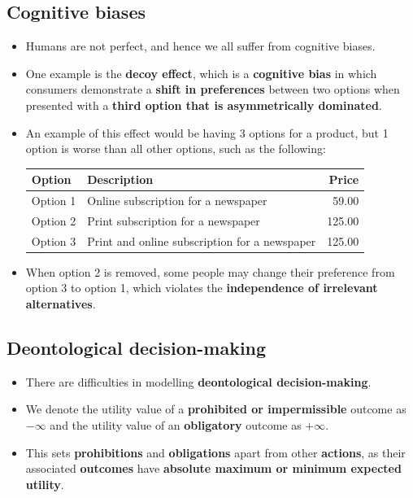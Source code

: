 \documentclass[11pt]{article}
\begin{document}
\subsection{Cognitive biases}
\label{sec:orgcbcae80}
\begin{itemize}
\item Humans are not perfect, and hence we all suffer from cognitive biases.
\item One example is the \textbf{decoy effect}, which is a \textbf{cognitive bias} in which consumers demonstrate a \textbf{shift in preferences} between two options when presented with a \textbf{third option that is asymmetrically dominated}.
\item An example of this effect would be having 3 options for a product, but 1 option is worse than all other options, such as the following:
\begin{center}
\begin{tabular}{l|l|r}
Option & Description & Price\\
\hline
Option 1 & Online subscription for a newspaper & 59.00\\
Option 2 & Print subscription for a newspaper & 125.00\\
Option 3 & Print and online subscription for a newspaper & 125.00\\
\end{tabular}
\end{center}

\item When option 2 is removed, some people may change their preference from option 3 to option 1, which violates the \textbf{independence of irrelevant alternatives}.
\end{itemize}
\subsection{Deontological decision-making}
\label{sec:orga078748}
\begin{itemize}
\item There are difficulties in modelling \textbf{deontological decision-making}.
\item We denote the utility value of a \textbf{prohibited or impermissible} outcome as \(-\infty\) and the utility value of an \textbf{obligatory} outcome as \(+\infty\).
\item This sets \textbf{prohibitions} and \textbf{obligations} apart from other \textbf{actions}, as their associated \textbf{outcomes} have \textbf{absolute maximum or minimum expected utility}.
\end{itemize}
\end{document}
